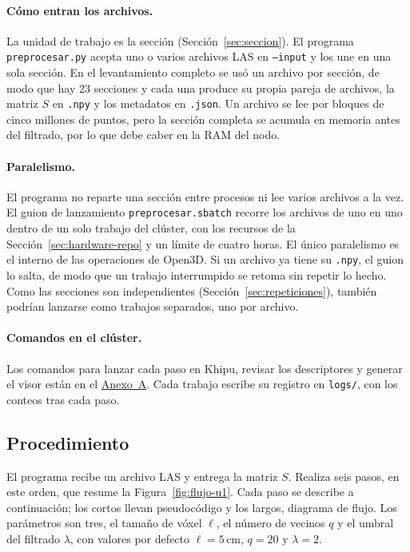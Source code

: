 \paragraph*{Cómo entran los archivos.}
La unidad de trabajo es la sección (Sección~\ref{sec:seccion}). El programa
\texttt{preprocesar.py} acepta uno o varios archivos LAS en \texttt{--input} y los
une en una sola sección. En el levantamiento completo se usó un archivo por
sección, de modo que hay 23 secciones y cada una produce su propia pareja de
archivos, la matriz $S$ en \texttt{.npy} y los metadatos en \texttt{.json}. Un
archivo se lee por bloques de cinco millones de puntos, pero la sección completa
se acumula en memoria antes del filtrado, por lo que debe caber en la RAM del
nodo.

\paragraph*{Paralelismo.}
El programa no reparte una sección entre procesos ni lee varios archivos a la
vez. El guion de lanzamiento \texttt{preprocesar.sbatch} recorre los archivos de
uno en uno dentro de un solo trabajo del clúster, con los recursos de la
Sección~\ref{sec:hardware-repo} y un límite de cuatro horas. El único
paralelismo es el interno de las operaciones de Open3D. Si un archivo ya tiene su
\texttt{.npy}, el guion lo salta, de modo que un trabajo interrumpido se retoma
sin repetir lo hecho. Como las secciones son independientes
(Sección~\ref{sec:repeticiones}), también podrían lanzarse como trabajos
separados, uno por archivo.

\paragraph*{Comandos en el clúster.}
Los comandos para lanzar cada paso en Khipu, revisar los descriptores y generar
el visor están en el \hyperref[sec:anexo-software]{Anexo~A}. Cada trabajo escribe su registro en
\texttt{logs/}, con los conteos tras cada paso.

\FloatBarrier
\subsection{Procedimiento}
\label{sec:u1-procedimiento}

El programa recibe un archivo LAS y entrega la matriz $S$. Realiza seis pasos,
en este orden, que resume la Figura~\ref{fig:flujo-u1}. Cada paso se describe a
continuación; los cortos llevan pseudocódigo y los largos, diagrama de flujo.
Los parámetros son tres, el tamaño de vóxel $\ell$, el número de vecinos $q$ y
el umbral del filtrado $\lambda$, con valores por defecto $\ell=5$\,cm, $q=20$ y
$\lambda=2$.

